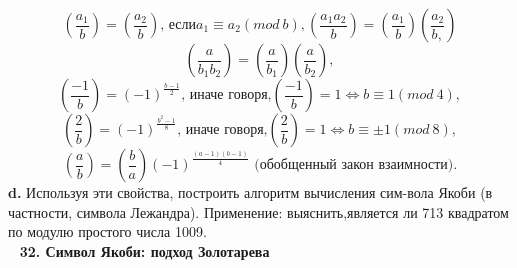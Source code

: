\documentclass{mai_book}
\begin{document}
        $$
        (\frac{a_1}{b})=(\frac{a_2}{b})\text{, если} a_1\equiv a_2 (mod\ b), (\frac{a_1 a_2}{b}) = (\frac{a_1}{b})(\frac{a_2}{b,})
        $$
        $$
        (\frac{a}{b_1 b_2}) = (\frac{a}{b_1})(\frac{a}{b_2}),
        $$
        $$
        (\frac{-1}{b}) = (-1)^{\frac{b-1}{2}}\text{, иначе говоря,} (\frac{-1}{b})=1 \Longleftrightarrow b\equiv 1 (mod\ 4),
        $$
        $$
        (\frac{2}{b}) = (-1)^{\frac{b^2-1}{8}}\text{, иначе говоря,} (\frac{2}{b})=1 \Longleftrightarrow b\equiv \pm 1 (mod\ 8),
        $$
        $$
        (\frac{a}{b}) = (\frac{b}{a})(-1)^{\frac{(a-1)(b-1)}{4}}\text{ (обобщенный закон взаимности).}
        $$
        \newline
\newpage
\textbf{d.} Используя эти свойства, построить алгоритм вычисления сим-\newline вола Якоби (в частности, символа Лежандра). Применение: выяснить,\newline является ли 713 квадратом по модулю простого числа 1009.\\
\ \newline
\noindent\textbf{32. Символ Якоби: подход Золотарева}\\
\end{document}
